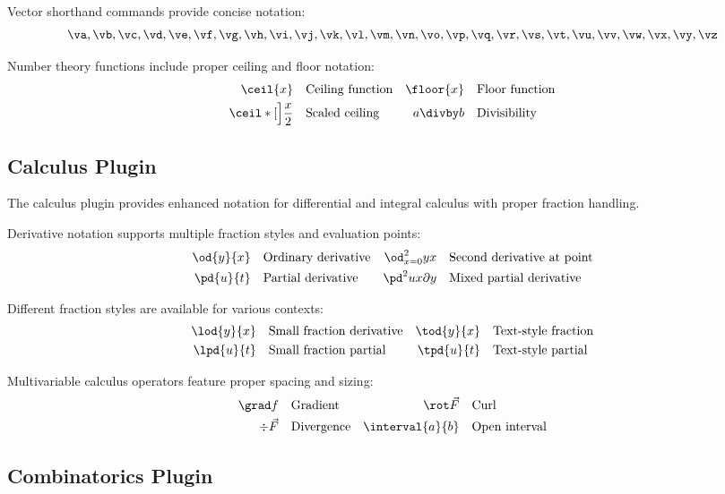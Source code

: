 \documentclass{article}
\begin{document}
Vector shorthand commands provide concise notation:
\[
\va, \vb, \vc, \vd, \ve, \vf, \vg, \vh, \vi, \vj, \vk, \vl, \vm, \vn, \vo, \vp, \vq, \vr, \vs, \vt, \vu, \vv, \vw, \vx, \vy, \vz
\]

Number theory functions include proper ceiling and floor notation:
\begin{align*}
\ceil{x} &\quad\text{Ceiling function} & \floor{x} &\quad\text{Floor function} \\
\ceil*[\Big]{\frac{x}{2}} &\quad\text{Scaled ceiling} & a \divby b &\quad\text{Divisibility}
\end{align*}

\subsection{Calculus Plugin}

The calculus plugin provides enhanced notation for differential and integral calculus with proper fraction handling.

Derivative notation supports multiple fraction styles and evaluation points:
\begin{align*}
\od{y}{x} &\quad\text{Ordinary derivative} &
\od^2_{x=0}{y}{x} &\quad\text{Second derivative at point} \\
\pd{u}{t} &\quad\text{Partial derivative} &
\pd^2{u}{x \partial y} &\quad\text{Mixed partial derivative}
\end{align*}

Different fraction styles are available for various contexts:
\begin{align*}
\lod{y}{x} &\quad\text{Small fraction derivative} &
\tod{y}{x} &\quad\text{Text-style fraction} \\
\lpd{u}{t} &\quad\text{Small fraction partial} &
\tpd{u}{t} &\quad\text{Text-style partial}
\end{align*}

Multivariable calculus operators feature proper spacing and sizing:
\begin{align*}
\grad f &\quad\text{Gradient} &
\rot \vec{F} &\quad\text{Curl} \\
\div \vec{F} &\quad\text{Divergence} &
\interval{a}{b} &\quad\text{Open interval}
\end{align*}

\subsection{Combinatorics Plugin}
\end{document}
